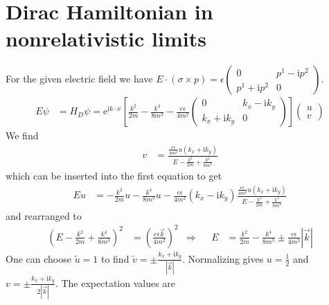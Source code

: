 \documentclass[english, parskip=full]{scrartcl}
\newcommand{\kla}{}
\newcommand{\klam}{}
\def\I{\text{i}}
\def\E{\text{e}}
\begin{document}
\section{Dirac Hamiltonian in nonrelativistic limits}
For the given electric field we have $E\cdot(\sigma\times p)=\epsilon\begin{pmatrix}
0&p^1-\I p^2 \\ p^1 + \I p^2 & 0
\end{pmatrix} $. 
\begin{align*}
E\psi&=H_D\psi=\E^{\I k\cdot x}\klam\left[ {\frac{k^2}{2m}-\frac{k^4}{8m^3}-\frac{e\epsilon}{4m^2}\begin{pmatrix}
0&k_x-\I k_y \\ k_x + \I k_y & 0
\end{pmatrix}} \right]\begin{pmatrix}
u \\ v
\end{pmatrix}
\end{align*}
We find
\begin{align*}
v&=\frac{\frac{e\epsilon}{4m^2}u(k_x+\I k_y)}{E-\frac{k^2}{2m}+\frac{k^4}{8m^3}}
\end{align*}
which can be inserted into the first equation to get
\begin{align*}
Eu&=-\frac{k^2}{2m}u-\frac{k^4}{8m^3}u-\frac{e\epsilon}{4m^2}(k_x-\I k_y)\frac{\frac{e\epsilon}{4m^2}u(k_x+\I k_y)}{E-\frac{k^2}{2m}+\frac{k^4}{8m^3}}
\end{align*}
and rearranged to
\begin{align*}
\kla\left( {E-\frac{k^2}{2m}+\frac{k^4}{8m^3}} \right)^2&=\kla\left( {\frac{e\epsilon\vec{k}}{4m^2}} \right)^2&\Rightarrow&& E&=\frac{k^2}{2m}-\frac{k^4}{8m^3}\pm\frac{e\epsilon}{4m^2}|\vec{k}|
\end{align*}
One can choose $\tilde{u}=1$ to find $\tilde{v}=\pm\frac{k_x+\I k_y}{|\vec{k}|}$. Normalizing gives $u=\frac{1}{2}$ and $v=\pm\frac{k_x+\I k_y}{2|\vec{k}|}$.
The expectation values are 
\end{document}
